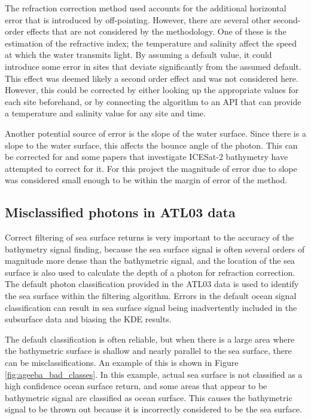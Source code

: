 The refraction correction method used accounts for the additional horizontal error that is introduced by off-pointing. However, there are several other second-order effects that are not considered by the methodology. One of these is the estimation of the refractive index; the temperature and salinity affect the speed at which the water transmits light. By assuming a default value, it could introduce some error in sites that deviate significantly from the assumed default. This effect was deemed likely a second order effect and was not considered here. However, this could be corrected by either looking up the appropriate values for each site beforehand, or by connecting the algorithm to an API that can provide a temperature and salinity value for any site and time.

Another potential source of error is the slope of the water surface. Since there is a slope to the water surface, this affects the bounce angle of the photon. This can be corrected for and some papers that investigate ICESat-2 bathymetry have attempted to correct for it. For this project the magnitude of error due to slope was considered small enough to be within the margin of error of the method.

\subsection{Misclassified photons in ATL03 data}

Correct filtering of sea surface returns is very important to the accuracy of the bathymetry signal finding, because the sea surface signal is often several orders of magnitude more dense than the bathymetric signal, and the location of the sea surface is also used to calculate the depth of a photon for refraction correction. The default photon classification provided in the ATL03 data is used to identify the sea surface within the filtering algorithm. Errors in the default ocean signal classification can result in sea surface signal being inadvertently included in the subsurface data and biasing the KDE results.

The default classification is often reliable, but when there is a large area where the bathymetric surface is shallow and nearly parallel to the sea surface, there can be misclassifications. An example of this is shown in Figure \ref{fig:ageeba_bad_classes}. In this example, actual sea surface is not classified as a high confidence ocean surface return, and some areas that appear to be bathymetric signal are classified as ocean surface. This causes the bathymetric signal to be thrown out because it is incorrectly considered to be the sea surface.

